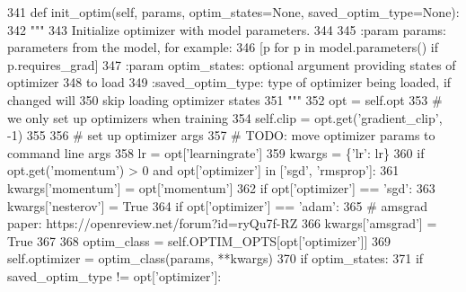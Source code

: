 \begin{DoxyCode}
341     \textcolor{keyword}{def }init\_optim(self, params, optim\_states=None, saved\_optim\_type=None):
342         \textcolor{stringliteral}{"""}
343 \textcolor{stringliteral}{        Initialize optimizer with model parameters.}
344 \textcolor{stringliteral}{}
345 \textcolor{stringliteral}{        :param params:       parameters from the model, for example:}
346 \textcolor{stringliteral}{                             [p for p in model.parameters() if p.requires\_grad]}
347 \textcolor{stringliteral}{        :param optim\_states: optional argument providing states of optimizer}
348 \textcolor{stringliteral}{                             to load}
349 \textcolor{stringliteral}{        :saved\_optim\_type:   type of optimizer being loaded, if changed will}
350 \textcolor{stringliteral}{                             skip loading optimizer states}
351 \textcolor{stringliteral}{        """}
352         opt = self.opt
353         \textcolor{comment}{# we only set up optimizers when training}
354         self.clip = opt.get(\textcolor{stringliteral}{'gradient\_clip'}, -1)
355 
356         \textcolor{comment}{# set up optimizer args}
357         \textcolor{comment}{# TODO: move optimizer params to command line args}
358         lr = opt[\textcolor{stringliteral}{'learningrate'}]
359         kwargs = \{\textcolor{stringliteral}{'lr'}: lr\}
360         \textcolor{keywordflow}{if} opt.get(\textcolor{stringliteral}{'momentum'}) > 0 \textcolor{keywordflow}{and} opt[\textcolor{stringliteral}{'optimizer'}] \textcolor{keywordflow}{in} [\textcolor{stringliteral}{'sgd'}, \textcolor{stringliteral}{'rmsprop'}]:
361             kwargs[\textcolor{stringliteral}{'momentum'}] = opt[\textcolor{stringliteral}{'momentum'}]
362             \textcolor{keywordflow}{if} opt[\textcolor{stringliteral}{'optimizer'}] == \textcolor{stringliteral}{'sgd'}:
363                 kwargs[\textcolor{stringliteral}{'nesterov'}] = \textcolor{keyword}{True}
364         \textcolor{keywordflow}{if} opt[\textcolor{stringliteral}{'optimizer'}] == \textcolor{stringliteral}{'adam'}:
365             \textcolor{comment}{# amsgrad paper: https://openreview.net/forum?id=ryQu7f-RZ}
366             kwargs[\textcolor{stringliteral}{'amsgrad'}] = \textcolor{keyword}{True}
367 
368         optim\_class = self.OPTIM\_OPTS[opt[\textcolor{stringliteral}{'optimizer'}]]
369         self.optimizer = optim\_class(params, **kwargs)
370         \textcolor{keywordflow}{if} optim\_states:
371             \textcolor{keywordflow}{if} saved\_optim\_type != opt[\textcolor{stringliteral}{'optimizer'}]:

\end{DoxyCode}
